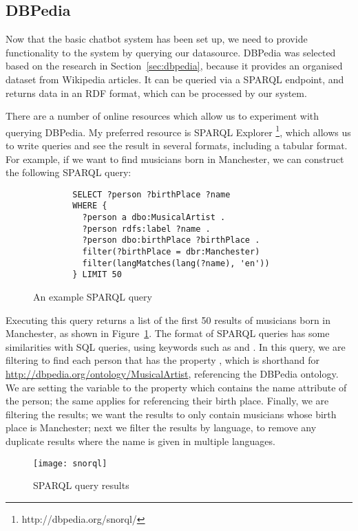 \newpage
\subsection{DBPedia}
Now that the basic chatbot system has been set up, we need to provide functionality to the system by querying our datasource. DBPedia was selected based on the research in Section~\ref{sec:dbpedia}, because it provides an organised dataset from Wikipedia articles. It can be queried via a SPARQL endpoint, and returns data in an RDF format, which can be processed by our system.

There are a number of online resources which allow us to experiment with querying DBPedia. My preferred resource is SPARQL Explorer \footnote{http://dbpedia.org/snorql/}, which allows us to write queries and see the result in several formats, including a tabular format. For example, if we want to find musicians born in Manchester, we can construct the following SPARQL query:
\begin{figure}[h]
	\begin{lstlisting}
		SELECT ?person ?birthPlace ?name
		WHERE {
		  ?person a dbo:MusicalArtist .
		  ?person rdfs:label ?name .
		  ?person dbo:birthPlace ?birthPlace .
		  filter(?birthPlace = dbr:Manchester)
		  filter(langMatches(lang(?name), 'en'))
		} LIMIT 50 
	\end{lstlisting}
	\caption{An example SPARQL query}
	\label{fig:sparql1}
\end{figure}

Executing this query returns a list of the first 50 results of musicians born in Manchester, as shown in Figure~\ref{fig:sparql1}. The format of SPARQL queries has some similarities with SQL queries, using keywords such as  and . In this query, we are filtering to find each person that has the property , which is shorthand for \url{http://dbpedia.org/ontology/MusicalArtist}, referencing the DBPedia ontology. We are setting the variable  to the property  which contains the name attribute of the person; the same applies for  referencing their birth place. Finally, we are filtering the results; we want the results to only contain musicians whose birth place is Manchester; next we filter the  results by language, to remove any duplicate results where the name is given in multiple languages.

\begin{figure}[h]
	\centering
	\texttt{[image: snorql]}
	\caption{SPARQL query results}
	\label{fig:sparql2}
\end{figure}

